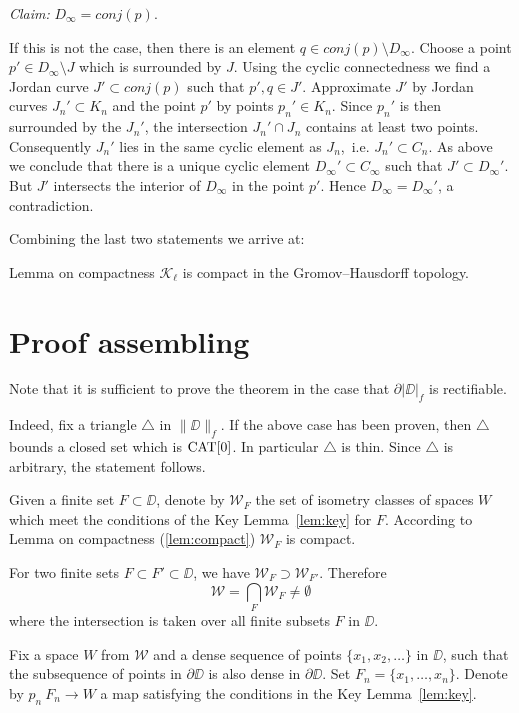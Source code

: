\documentclass[a4paper,10pt]{amsart}
\begin{document}
{\it Claim:} $D_\infty=conj(p)$.

\noindent If this is not the case, then there is an element $q\in conj(p)\setminus D_\infty$. Choose a point $p'\in D_\infty\setminus J$ which is surrounded 
by $J$. Using the cyclic connectedness we find a Jordan curve $J'\subset conj(p)$ such that $p',q\in J'$. Approximate $J'$
by Jordan curves $J_n'\subset K_n$ and the point $p'$ by points $p_n'\in K_n$. Since $p_n'$ is then surrounded by the $J_n'$, the intersection
$J_n'\cap J_n$ contains at least two points. Consequently $J_n'$ lies in the same cyclic element as $J_n$,\ i.e. $J_n'\subset C_n$. As
above we conclude that there is a unique cyclic element $D_\infty'\subset C_\infty$ such that $J'\subset D_\infty'$. But 
$J'$ intersects the interior of $D_\infty$ in the point $p'$. Hence $D_\infty=D_\infty'$, a contradiction.
\qeds

Combining the last two statements we arrive at:

\begin{thm}{Lemma on compactness}\label{lem:compact}
$\mathcal{K}_\ell$ is compact in the Gromov--Hausdorff topology.
\end{thm}



\section{Proof assembling}

Note that it is sufficient to prove the theorem 
in the case that $\partial |\DD|_f$ is rectifiable.

Indeed, fix a triangle $\triangle$ in $\|\DD\|_f$.
If the above case has been proven, 
then $\triangle$ bounds a closed set which is $\mathop{\rm CAT}\nolimits[0]$.
In particular $\triangle$ is thin.
Since $\triangle$ is arbitrary, the statement follows.

Given a finite set $F\subset \DD$,
denote by $\mathcal{W}_F$
the set of isometry classes of spaces $W$ which meet the conditions of the Key Lemma~\ref{lem:key}
for $F$.
According to Lemma on compactness (\ref{lem:compact}) $\mathcal{W}_F$ is compact.

For two finite sets $F\subset F'\subset \DD$,
we have $\mathcal{W}_F\supset \mathcal{W}_{F'}$.
Therefore 
\[\mathcal{W}
=
\bigcap_{F}\mathcal{W}_F\ne \emptyset\]
where the intersection is taken over all finite subsets $F$ in $\DD$.

Fix a space $W$ from $\mathcal{W}$
and a dense sequence of points $\{x_1,x_2,\dots\}$ in $\DD$,
such that the subsequence of points in $\partial \DD$
is also dense in $\partial \DD$.
Set $F_n=\{x_1,\dots,x_n\}$.
Denote by $p_n\:F_n\to W$ a map satisfying the conditions in the Key Lemma~\ref{lem:key}.
\end{document}
